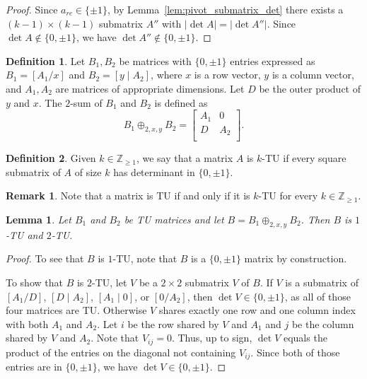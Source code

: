 \documentclass{article}
\newtheorem{lemma}{Lemma}
\theoremstyle{definition}
\newtheorem{definition}{Definition}
\newtheorem{remark}{Remark}
\begin{document}
\begin{proof}
    Since $a_{rc} \in \{\pm 1\}$, by Lemma~\ref{lem:pivot_submatrix_det} there exists a $(k - 1) \times (k - 1)$ submatrix $A''$ with $|\det A| = |\det A''|$. Since $\det A \notin \{0, \pm 1\}$, we have $\det A'' \notin \{0, \pm 1\}$.
\end{proof}

\begin{definition}\label{def:two_sum}
    Let $B_{1}, B_{2}$ be matrices with $\{0, \pm 1\}$ entries expressed as $B_{1} = \left[A_{1} / x\right]$ and $B_{2} = \left[y \mid A_{2}\right]$, where $x$ is a row vector, $y$ is a column vector, and $A_{1}, A_{2}$ are matrices of appropriate dimensions. Let $D$ be the outer product of $y$ and $x$. The $2$-sum of $B_{1}$ and $B_{2}$ is defined as
    \[
        B_{1} \oplus_{2, x, y} B_{2} = \begin{bmatrix}
            A_{1} & 0 \\
            D & A_{2} \\
        \end{bmatrix}.
    \]
\end{definition}

\begin{definition}\label{def:k_tu}
    Given $k \in \mathbb{Z}_{\geq 1}$, we say that a matrix $A$ is $k$-TU if every square submatrix of $A$ of size $k$ has determinant in $\{0, \pm 1\}$.
\end{definition}

\begin{remark}
    Note that a matrix is TU if and only if it is $k$-TU for every $k \in \mathbb{Z}_{\geq 1}$.
\end{remark}

\begin{lemma}\label{lem:two_sum_1_2_tu}
    Let $B_{1}$ and $B_{2}$ be TU matrices and let $B = B_{1} \oplus_{2, x, y} B_{2}$. Then $B$ is $1$-TU and $2$-TU.
\end{lemma}

\begin{proof}
    To see that $B$ is $1$-TU, note that $B$ is a $\{0, \pm 1\}$ matrix by construction.

    To show that $B$ is $2$-TU, let $V$ be a $2 \times 2$ submatrix $V$ of $B$. If $V$ is a submatrix of $\left[A_{1} / D\right]$, $\left[D \mid A_{2}\right]$, $\left[A_{1} \mid 0\right]$, or $\left[0 / A_{2}\right]$, then $\det V \in \{0, \pm 1\}$, as all of those four matrices are TU. Otherwise $V$ shares exactly one row and one column index with both $A_{1}$ and $A_{2}$. Let $i$ be the row shared by $V$ and $A_{1}$ and $j$ be the column shared by $V$ and $A_{2}$. Note that $V_{ij} = 0$. Thus, up to sign, $\det V$ equals the product of the entries on the diagonal not containing $V_{ij}$. Since both of those entries are in $\{0, \pm 1\}$, we have $\det V \in \{0, \pm 1\}$.
\end{proof}
\end{document}
